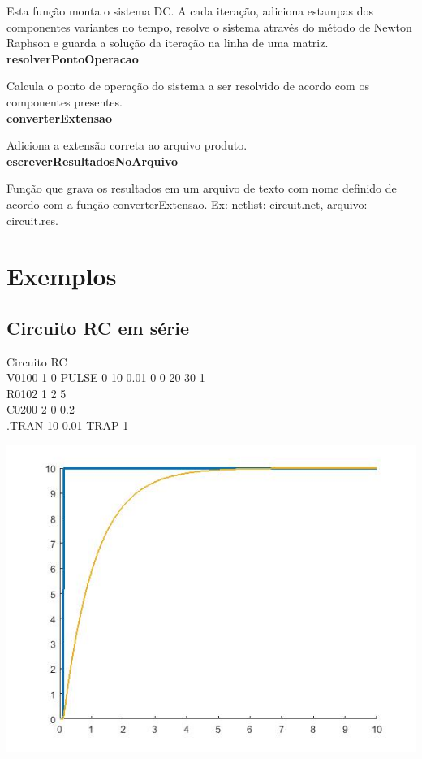 \documentclass[12pt]{article}
\begin{document}
  Esta função monta o sistema DC. A cada iteração, adiciona estampas dos componentes variantes no tempo, resolve o sistema através do método de Newton Raphson e guarda a solução da iteração na linha de uma matriz.\\

  \textbf{resolverPontoOperacao}

  Calcula o ponto de operação do sistema a ser resolvido de acordo com os componentes presentes.\\

  \textbf{converterExtensao}

  Adiciona a extensão correta ao arquivo produto.\\

  \textbf{escreverResultadosNoArquivo}

  Função que grava os resultados em um arquivo de texto com nome definido de acordo com a função converterExtensao. Ex: netlist: circuit.net, arquivo: circuit.res.

\pagebreak
\section{Exemplos}

\subsection{Circuito RC em série}
  Circuito RC\\
  V0100 1 0 PULSE 0 10 0.01 0 0 20 30 1\\
  R0102 1 2 5\\
  C0200 2 0 0.2\\
  .TRAN 10 0.01 TRAP 1\\

  \begin{center}
  \hspace*{-2.5cm}\includegraphics[scale=0.75]{rc}
\end{center}
\pagebreak
\end{document}
